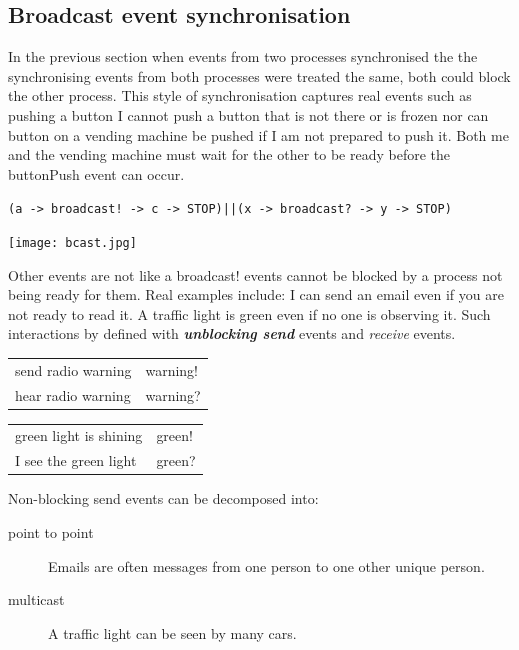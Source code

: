 \documentclass[]{article}
\begin{document}
\subsection{Broadcast event synchronisation}
In the previous section when events from two processes synchronised  the the synchronising events from both processes were treated the same, both could block the other process. This style of synchronisation captures real events such as {\sf pushing a button} I cannot push a button that is not there or is frozen nor can  button on a vending machine be pushed if  I am not prepared  to push it. Both me and the vending machine must wait for the other to be ready before the {\sf buttonPush} event can occur.


\begin{center}\verb$(a -> broadcast! -> c -> STOP)||(x -> broadcast? -> y -> STOP)$

	\texttt{[image: bcast.jpg]} \end{center}




Other events are not like a {\sf broadcast!}  events cannot be blocked by a process not being ready for them. Real examples include:  I can send an email even if you are not ready to read it. A traffic light  is green even if no one is observing it.  Such interactions  by defined with  \emph{\bf unblocking send} events and \emph{receive} events.

\hspace{\fill}
\begin{tabular}{ll}
send radio warning & {\sf warning!} \\
hear radio warning & {\sf warning?}
\end{tabular} \hspace{\fill}
\begin{tabular}{ll}
green light is shining  & {\sf green!} \\
I see the green light & {\sf green?}
\end{tabular}
\hspace{\fill}



Non-blocking send events can be decomposed into:
\begin{description}
\item[point to point] Emails are often messages from one person to one other  unique person.
\item[multicast] A traffic light can be seen by many cars.
\end{description}
\end{document}
